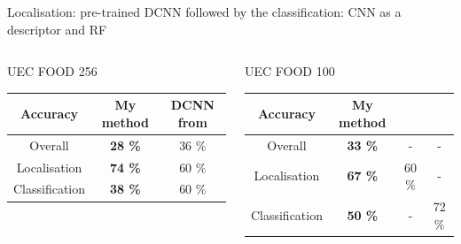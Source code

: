 \documentclass[aspectratio=169]{beamer}
\newenvironment{myframe}[1][t]{\begin{frame}[#1]{\secname}{\subsecname}}{\end{frame}}
\begin{document}
    \begin{myframe}
        Localisation: pre-trained DCNN followed by the classification: CNN as a descriptor and RF
        
        \begin{columns}
            \begin{center}
                UEC FOOD 256
                \vspace{0.5cm}
                
                \renewcommand{\arraystretch}{1.3} %
                \begin{tabulary}{\textwidth}{|| c | C C||}
                    \hline
                    Accuracy & My method & DCNN from \cite{Bolanos2016} \\
                    \hline\hline
                    Overall & \textbf{28 \%} & 36 \% \\ 
                    \hline
                    Localisation &  \textbf{74 \%} & 60 \% \\
                    \hline
                    Classification &  \textbf{38 \%} & 60 \% \\
                    \hline
                \end{tabulary}
            \end{center}
            
            \begin{center}
                UEC FOOD 100
                \vspace{0.5cm}
                
                \renewcommand{\arraystretch}{1.3} %
                \begin{tabulary}{\textwidth}{|| C | C c c||} 
                    \hline
                    Accuracy & My method & \cite{Shimoda2015} & \cite{Kawano2014} \\
                    \hline\hline
                    Overall & \textbf{33 \%} & - & - \\ 
                    \hline
                    Localisation &  \textbf{67 \%} & 60 \% & - \\
                    \hline
                    Classification &  \textbf{50 \%} & -  & 72 \% \\
                    \hline
                \end{tabulary}
            \end{center}
        \end{columns}
    \end{myframe}
    
\end{document}
